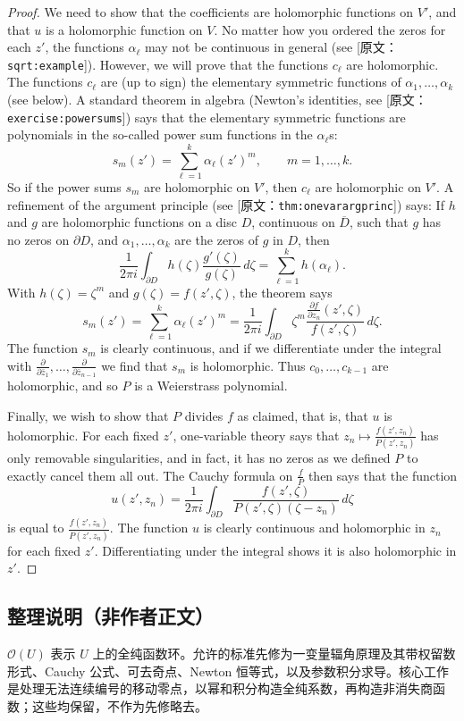 \documentclass[UTF8,11pt]{ctexart}
\theoremstyle{definition}
\newcommand{\sO}{\mathscr O}
\newcommand{\widebar}[1]{\overline{#1}}
\newcommand{\nicefrac}[2]{\frac{#1}{#2}}
\newcommand{\sourceref}[1]{\textnormal{[原文：\nolinkurl{#1}]}}
\newcommand{\thmref}[1]{\sourceref{#1}}
\newcommand{\exampleref}[1]{\sourceref{#1}}
\newcommand{\exerciseref}[1]{\sourceref{#1}}
\begin{document}
\begin{proof}
We need to show that the coefficients are holomorphic functions on $V'$, and that $u$ is a holomorphic function on $V$. No matter how you ordered the zeros for each $z'$, the functions $\alpha_\ell$ may not be continuous in general (see \exampleref{sqrt:example}). However, we will prove that the functions $c_\ell$ are holomorphic. The functions $c_\ell$ are (up to sign) the elementary symmetric functions of $\alpha_1,\ldots,\alpha_k$ (see below). A standard theorem in algebra (Newton's identities, see \exerciseref{exercise:powersums}) says that the elementary symmetric functions are polynomials in the so-called power sum functions in the $\alpha_\ell$s:
\[
s_m(z')=\sum_{\ell=1}^k\alpha_\ell(z')^m,\qquad m=1,\ldots,k.
\]
So if the power sums $s_m$ are holomorphic on $V'$, then $c_\ell$ are holomorphic on $V'$. A refinement of the argument principle (see \thmref{thm:onevarargprinc}) says: If $h$ and $g$ are holomorphic functions on a disc $D$, continuous on $\widebar D$, such that $g$ has no zeros on $\partial D$, and $\alpha_1,\ldots,\alpha_k$ are the zeros of $g$ in $D$, then
\[
\frac1{2\pi i}\int_{\partial D}h(\zeta)\frac{g'(\zeta)}{g(\zeta)}\,d\zeta=\sum_{\ell=1}^kh(\alpha_\ell).
\]
With $h(\zeta)=\zeta^m$ and $g(\zeta)=f(z',\zeta)$, the theorem says
\[
s_m(z')=\sum_{\ell=1}^k\alpha_\ell(z')^m=\frac1{2\pi i}\int_{\partial D}\zeta^m\frac{\frac{\partial f}{\partial z_n}(z',\zeta)}{f(z',\zeta)}\,d\zeta.
\]
The function $s_m$ is clearly continuous, and if we differentiate under the integral with $\frac\partial{\partial\bar z_1},\ldots,\frac\partial{\partial\bar z_{n-1}}$ we find that $s_m$ is holomorphic. Thus $c_0,\ldots,c_{k-1}$ are holomorphic, and so $P$ is a Weierstrass polynomial.

Finally, we wish to show that $P$ divides $f$ as claimed, that is, that $u$ is holomorphic. For each fixed $z'$, one-variable theory says that $z_n\mapsto\frac{f(z',z_n)}{P(z',z_n)}$ has only removable singularities, and in fact, it has no zeros as we defined $P$ to exactly cancel them all out. The Cauchy formula on $\nicefrac fP$ then says that the function
\[
u(z',z_n)=\frac1{2\pi i}\int_{\partial D}\frac{f(z',\zeta)}{P(z',\zeta)(\zeta-z_n)}\,d\zeta
\]
is equal to $\frac{f(z',z_n)}{P(z',z_n)}$. The function $u$ is clearly continuous and holomorphic in $z_n$ for each fixed $z'$. Differentiating under the integral shows it is also holomorphic in $z'$.
\end{proof}

\subsection*{整理说明（非作者正文）}
$\sO(U)$ 表示 $U$ 上的全纯函数环。允许的标准先修为一变量辐角原理及其带权留数形式、Cauchy 公式、可去奇点、Newton 恒等式，以及参数积分求导。核心工作是处理无法连续编号的移动零点，以幂和积分构造全纯系数，再构造非消失商函数；这些均保留，不作为先修略去。
\end{document}
